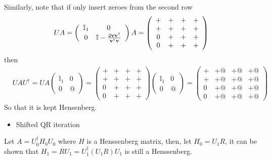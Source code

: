 Similarly, note that if only insert zeroes from the second row
\begin{equation}
\begin{split}
&UA=\left(\begin{array}{cc}\mathbb{I}_1 & 0 \\ 0 & \mathbb{I}-\frac{2{\bf v}{\bf v}^{\dagger}}{{\bf v}^{\dagger}{\bf v}} \end{array}\right)A=\left(\begin{array}{cccc}
+ & + & + & + \\ + & + & + & + \\ 0 & + & + & + \\ 0 & + & + & +\end{array}\right)\\
\end{split}
\end{equation}
then
\begin{equation}
\begin{split}
&UAU^{\dagger}=UA\left(\begin{array}{cc}\mathbb{I}_1 & 0 \\ 0 & @ \end{array}\right)=\left(\begin{array}{cccc}
+ & + & + & + \\ + & + & + & + \\ 0 & + & + & + \\ 0 & + & + & +\end{array}\right)\left(\begin{array}{cc}\mathbb{I}_1 & 0 \\ 0 & @ \end{array}\right)=\left(\begin{array}{cccc}
+ & +@ & +@ & +@ \\ + & +@ & +@ & +@ \\ 0 & +@ & +@ & +@ \\ 0 & +@ & +@ & +@\end{array}\right)
\end{split}
\end{equation}
So that it is kept Hensenberg.

\begin{itemize}
  \item {}Shifted QR iteration
\end{itemize}

Let $A=U_0^{\dagger}H_0U_0$ where $H$ is a Henssenberg matrix, then, let $H_0=U_1R$, it can be shown that $H_1=RU_1=U_1^{\dagger}(U_1R)U_1$ is still a Henssenberg.

